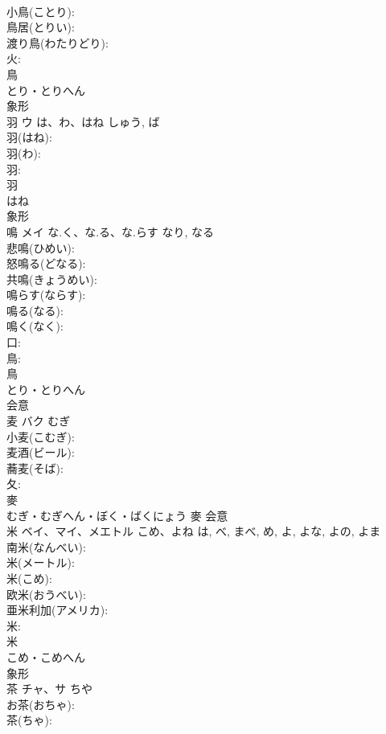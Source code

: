 \documentclass[8pt]{extreport}
\begin{document}
\begin{CJK}{UTF8}{min}
\\	小鳥(ことり): 
\\	鳥居(とりい): 
\\	渡り鳥(わたりどり): 
\\	火: 
\\	鳥	
\\	とり・とりへん	
\\	象形 
\\	羽	ウ	は、わ、はね	しゅう, ば	
\\	羽(はね): 
\\	羽(わ): 
\\	羽: 
\\	羽	
\\	はね	
\\	象形 
\\	鳴	メイ	な.く、な.る、な.らす	なり, なる	
\\	悲鳴(ひめい): 
\\	怒鳴る(どなる): 
\\	共鳴(きょうめい): 
\\	鳴らす(ならす): 
\\	鳴る(なる): 
\\	鳴く(なく): 
\\	口: 
\\	鳥: 
\\	鳥	
\\	とり・とりへん	
\\	会意 
\\	麦	バク	むぎ		
\\	小麦(こむぎ): 
\\	麦酒(ビール): 
\\	蕎麦(そば): 
\\	夂: 
\\	麥	
\\	むぎ・むぎへん・ぼく・ばくにょう	麥	会意 
\\	米	ベイ、マイ、メエトル	こめ、よね	は, べ, まべ, め, よ, よな, よの, よま	
\\	南米(なんべい): 
\\	米(メートル): 
\\	米(こめ): 
\\	欧米(おうべい): 
\\	亜米利加(アメリカ): 
\\	米: 
\\	米	
\\	こめ・こめへん	
\\	象形 
\\	茶	チャ、サ		ちや	
\\	お茶(おちゃ): 
\\	茶(ちゃ): 

\end{CJK}
\end{document}
